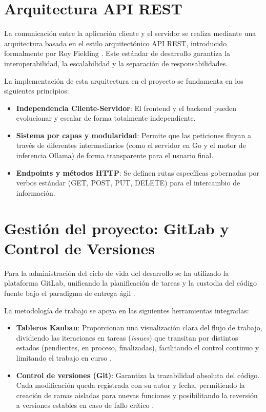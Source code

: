 \section{Arquitectura API REST}
La comunicación entre la aplicación cliente y el servidor se realiza mediante una arquitectura basada en el estilo arquitectónico API REST, introducido formalmente por Roy Fielding \cite{fielding_rest}. Este estándar de desarrollo garantiza la interoperabilidad, la escalabilidad y la separación de responsabilidades.

La implementación de esta arquitectura en el proyecto se fundamenta en los siguientes principios:
\begin{itemize}
    \item \textbf{Independencia Cliente-Servidor}: El frontend y el backend pueden evolucionar y escalar de forma totalmente independiente.
    \item \textbf{Sistema por capas y modularidad}: Permite que las peticiones fluyan a través de diferentes intermediarios (como el servidor en Go y el motor de inferencia Ollama) de forma transparente para el usuario final.
    \item \textbf{Endpoints y métodos HTTP}: Se definen rutas específicas gobernadas por verbos estándar (GET, POST, PUT, DELETE) para el intercambio de información.
\end{itemize}

\section{Gestión del proyecto: GitLab y Control de Versiones}
Para la administración del ciclo de vida del desarrollo se ha utilizado la plataforma GitLab, unificando la planificación de tareas y la custodia del código fuente bajo el paradigma de entrega ágil \cite{gitlab_agile}.

La metodología de trabajo se apoya en las siguientes herramientas integradas:
\begin{itemize}
    \item \textbf{Tableros Kanban}: Proporcionan una visualización clara del flujo de trabajo, dividiendo las iteraciones en tareas (\textit{issues}) que transitan por distintos estados (pendientes, en proceso, finalizadas), facilitando el control continuo y limitando el trabajo en curso \cite{anderson_kanban, gitlab_kanban}.
    \item \textbf{Control de versiones (Git)}: Garantiza la trazabilidad absoluta del código. Cada modificación queda registrada con su autor y fecha, permitiendo la creación de ramas aisladas para nuevas funciones y posibilitando la reversión a versiones estables en caso de fallo crítico \cite{gitlab_version_control}.
\end{itemize}